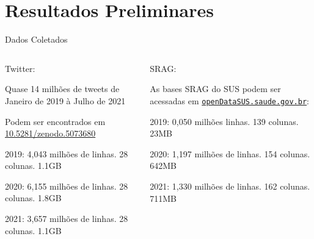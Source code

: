 \documentclass[aspectratio=169]{beamer}                    %
\begin{document}
\section{Resultados Preliminares}
\begin{frame}{Dados Coletados}
    \begin{columns}
        \begin{column}{0.5\textwidth}
            \large Twitter:
            \vfill
            \begin{vfilleditems}
                \item Quase 14 milhões de tweets de Janeiro de 2019 à Julho de 2021 \parencite{santosBrazilianPortugueseCOVID192021}
                \item Podem ser encontrados em \href{https://doi.org/10.5281/zenodo.5073680}{10.5281/zenodo.5073680}
                \begin{vfilleditems}
                    \item 2019: 4,043 milhões de linhas. 28 colunas. 1.1GB
                    \item 2020: 6,155 milhões de linhas. 28 colunas. 1.8GB
                    \item 2021: 3,657 milhões de linhas. 28 colunas. 1.1GB
                \end{vfilleditems}
            \end{vfilleditems}
        \end{column}
        \begin{column}{0.5\textwidth}
            \large SRAG:
            \vfill
            \begin{vfilleditems}
                \item As bases SRAG do SUS podem ser acessadas em \href{https://opendatasus.saude.gov.br/dataset?tags=SRAG}{\texttt{openDataSUS.saude.gov.br}}:
                \begin{vfilleditems}
                    \item 2019: 0,050 milhões linhas. 139 colunas. 23MB
                    \item 2020: 1,197 milhões de linhas. 154 colunas. 642MB
                    \item 2021: 1,330 milhões de linhas. 162 colunas. 711MB
                \end{vfilleditems}
            \end{vfilleditems}
        \end{column}
    \end{columns}
\end{frame}
\end{document}
